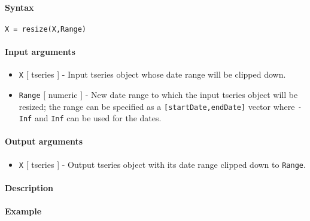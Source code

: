 


	\paragraph{Syntax}

\begin{verbatim}
X = resize(X,Range)
\end{verbatim}

\paragraph{Input arguments}

\begin{itemize}
\item
  \texttt{X} {[} tseries {]} - Input tseries object whose date range
  will be clipped down.
\item
  \texttt{Range} {[} numeric {]} - New date range to which the input
  tseries object will be resized; the range can be specified as a
  \texttt{{[}startDate,endDate{]}} vector where \texttt{-Inf} and
  \texttt{Inf} can be used for the dates.
\end{itemize}

\paragraph{Output arguments}

\begin{itemize}
\itemsep1pt\parskip0pt
\item
  \texttt{X} {[} tseries {]} - Output tseries object with its date range
  clipped down to \texttt{Range}.
\end{itemize}

\paragraph{Description}

\paragraph{Example}


